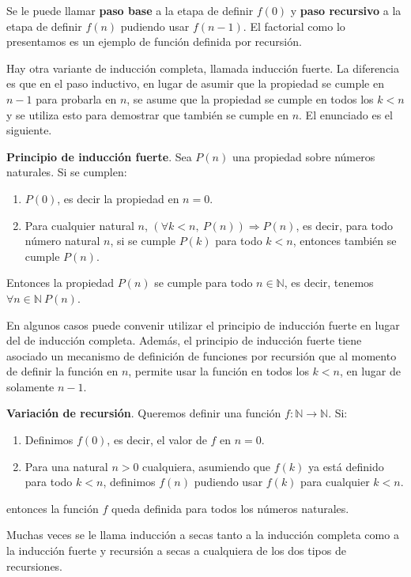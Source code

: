 \documentclass[a4paper, 12pt]{report}
\newcommand{\Ra}{\Rightarrow}
\newcommand{\N}{\mathbb{N}}
\theoremstyle{definition}
\begin{document}
\vspace{0.5em}
Se le puede llamar {\bf paso base} a la etapa de definir $f(0)$ y {\bf paso recursivo} a la etapa de definir $f(n)$ pudiendo usar $f(n-1)$. 
El factorial como lo presentamos es un ejemplo de función definida por recursión.

Hay otra variante de inducción completa, llamada inducción fuerte. La diferencia es que en el paso inductivo, en lugar de asumir que la propiedad se cumple en $n-1$ para probarla en $n$, se asume que la propiedad se cumple en todos los $k<n$ y se utiliza esto para demostrar que también se cumple en $n$. El enunciado es el siguiente.

{\bf Principio de inducción fuerte}. Sea $P(n)$ una propiedad sobre números naturales. Si se cumplen:
\begin{enumerate}
	\item $P(0)$, es decir la propiedad en $n=0$. 
	\item Para cualquier natural $n$,  $(\forall k<n,~P(n))\Ra P(n)$, es decir, para todo número natural $n$, si se cumple $P(k)$ para todo $k<n$, entonces también se cumple $P(n)$. 
\end{enumerate} 
Entonces la propiedad $P(n)$ se cumple para todo $n\in\N$, es decir, tenemos $\forall n\in\N~P(n)$.

En algunos casos puede convenir utilizar el principio de inducción fuerte en lugar del de inducción completa. Además, el principio de inducción fuerte tiene asociado un mecanismo de definición de funciones por recursión que al momento de definir la función en $n$, permite usar la función en todos los $k<n$, en lugar de solamente $n-1$.

{\bf Variación de recursión}. Queremos definir una función $f:\N\to\N$. Si:
\begin{enumerate}
	\item Definimos $f(0)$, es decir, el valor de $f$ en $n=0$.
	\item Para una natural $n>0$ cualquiera, asumiendo que $f(k)$ ya está definido para todo $k<n$, definimos $f(n)$ pudiendo usar $f(k)$ para cualquier $k<n$.
\end{enumerate}
entonces la función $f$ queda definida para todos los números naturales.

Muchas veces se le llama inducción a secas tanto a la inducción completa como a la inducción fuerte y recursión a secas a cualquiera de los dos tipos de recursiones.
\end{document}
